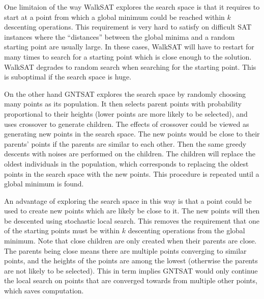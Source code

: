 One limitaion of the way WalkSAT explores the search space is that it requires
to start at a point from which a global minimum could be reached within
$k$ descenting operations. This requirement is very hard to
satisfy on difficult SAT instances where the ``distances'' between the global
minima and a random starting point are usually large. In these cases, WalkSAT
will have to restart for many times to search for a starting point which is
close enough to the solution. WalkSAT degrades to random search when searching
for the starting point. This is suboptimal if the search space is huge.

On the other hand GNTSAT explores the search space by randomly choosing many
points as its population. It then selects parent points with probability
proportional to their heights (lower points are more likely to be selected),
and uses crossover to generate children. The effects of crossover could be
viewed as generating new points in the search space. The new points would be
close to their parents' points if the parents are similar to each other. Then
the same greedy descents with noises are performed on the children. The
children will replace the oldest individuals in the population, which
corresponds to replacing the oldest points in the search space with the new
points. This procedure is repeated until a global minimum is found.

An advantage of exploring the search space in this way is that a point could
be used to create new points which are likely be close to it. The new points
will then be descented using stochastic local search. This removes the
requirement that one of the starting points must be within
$k$ descenting operations from the global minimum. Note
that close children are only created when their parents are close. The parents
being close means there are multiple points converging to similar points, and
the heights of the points are among the lowest (otherwise the parents are not
likely to be selected). This in term implies GNTSAT would only continue the local
search on points that are converged towards from multiple other points, which saves
computation.


